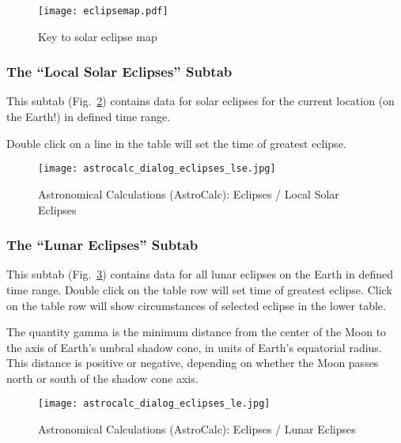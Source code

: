 \begin{figure}[htbp]
\centering\texttt{[image: eclipsemap.pdf]}
\caption{Key to solar eclipse map}
\label{fig:gui:AstroCalc:Eclipses:EclipseMap}
\end{figure}

\subsubsection{The ``Local Solar Eclipses'' Subtab}
\label{sec:gui:AstroCalc:Eclipses:LocalSolarEclipses}

This subtab (Fig.~\ref{fig:gui:AstroCalc:Eclipses:LocalSolarEclipses}) contains data for solar eclipses for the current location (on the Earth!) in defined time range. 

Double click on a line in the table will set the time of greatest eclipse.

\begin{figure}[htbp]
\centering\texttt{[image: astrocalc\_dialog\_eclipses\_lse.jpg]}
\caption{Astronomical Calculations (AstroCalc): Eclipses / Local Solar Eclipses}
\label{fig:gui:AstroCalc:Eclipses:LocalSolarEclipses}
\end{figure}


\subsubsection{The ``Lunar Eclipses'' Subtab}
\label{sec:gui:AstroCalc:Eclipses:LunarEclipses}

This subtab (Fig.~\ref{fig:gui:AstroCalc:Eclipses:LunarEclipses}) contains data for all lunar eclipses on the Earth in defined time range.
Double click on the table row will set time of greatest eclipse. Click on the table row will show circumstances of selected eclipse in the lower table.

The quantity gamma is the minimum distance from the center of the Moon to the axis of Earth’s umbral shadow cone, in units of Earth’s equatorial radius.
This distance is positive or negative, depending on whether the Moon passes north or south of the shadow cone axis.

\begin{figure}[p]
\centering\texttt{[image: astrocalc\_dialog\_eclipses\_le.jpg]}
\caption{Astronomical Calculations (AstroCalc): Eclipses / Lunar Eclipses}
\label{fig:gui:AstroCalc:Eclipses:LunarEclipses}
\end{figure}

